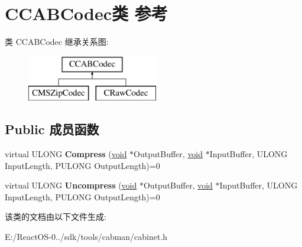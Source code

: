 \hypertarget{class_c_c_a_b_codec}{}\section{C\+C\+A\+B\+Codec类 参考}
\label{class_c_c_a_b_codec}
类 C\+C\+A\+B\+Codec 继承关系图\+:\begin{figure}[H]
\begin{center}
\leavevmode
\includegraphics[height=2.000000cm]{class_c_c_a_b_codec}
\end{center}
\end{figure}
\subsection*{Public 成员函数}
\begin{DoxyCompactItemize}
\item 
\mbox{\label{class_c_c_a_b_codec_a8faf774ad96743cfbc50d4b8dc304a31}} 
virtual U\+L\+O\+NG {\bfseries Compress} (\hyperlink{interfacevoid}{void} $\ast$Output\+Buffer, \hyperlink{interfacevoid}{void} $\ast$Input\+Buffer, U\+L\+O\+NG Input\+Length, P\+U\+L\+O\+NG Output\+Length)=0
\item 
\mbox{\label{class_c_c_a_b_codec_a981eeab654550c9c7a6a281bdf96cafe}} 
virtual U\+L\+O\+NG {\bfseries Uncompress} (\hyperlink{interfacevoid}{void} $\ast$Output\+Buffer, \hyperlink{interfacevoid}{void} $\ast$Input\+Buffer, U\+L\+O\+NG Input\+Length, P\+U\+L\+O\+NG Output\+Length)=0
\end{DoxyCompactItemize}


该类的文档由以下文件生成\+:\begin{DoxyCompactItemize}
\item 
E\+:/\+React\+O\+S-\/0../sdk/tools/cabman/cabinet.\+h\end{DoxyCompactItemize}
